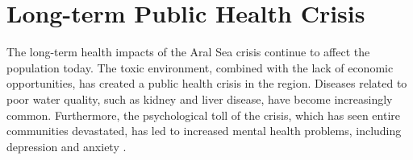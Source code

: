 \section{Long-term Public Health Crisis}
The long-term health impacts of the Aral Sea crisis continue to affect the population today. The toxic environment, combined with the lack of economic opportunities, has created a public health crisis in the region. Diseases related to poor water quality, such as kidney and liver disease, have become increasingly common. Furthermore, the psychological toll of the
crisis, which has seen entire communities devastated, has led to increased mental health problems, including depression and anxiety \autocite{anchita2021health}.
